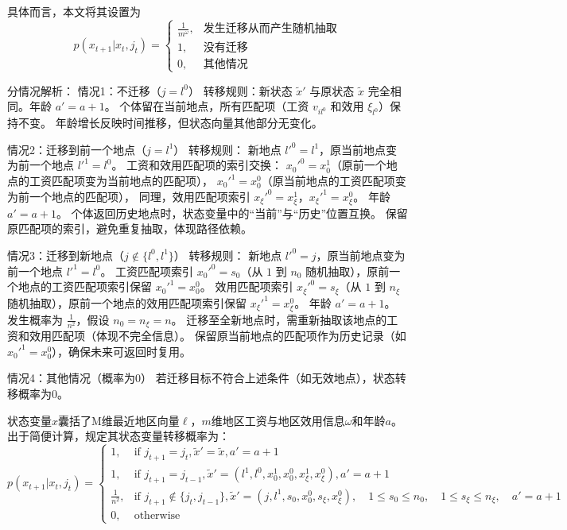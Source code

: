 \documentclass[a4paper,12pt,oneside]{book} %
\begin{document}
具体而言，本文将其设置为
\begin{equation}
  p(x_{t+1}|x_t,j_t)=
  \begin{cases}
    \frac{1}{m^\omega}
    , &\text{发生迁移从而产生随机抽取}
    \\
    1
    , &\text{没有迁移}
    \\
    0
    , &\text{其他情况}
  \end{cases}
\end{equation}

分情况解析：
情况1：不迁移（$j = l^0$）
转移规则：新状态 $\tilde{x}'$ 与原状态 $\tilde{x}$ 完全相同。年龄 $a' = a + 1$。
个体留在当前地点，所有匹配项（工资 $v_{il^0}$ 和效用 $\xi_{l^0}$）保持不变。
年龄增长反映时间推移，但状态向量其他部分无变化。

情况2：迁移到前一个地点（$j = l^1$）
转移规则：
新地点 $l'^0 = l^1$，原当前地点变为前一个地点 $l'^1 = l^0$。
工资和效用匹配项的索引交换：  
$x_0'^0 = x_0^1$（原前一个地点的工资匹配项变为当前地点的匹配项），  
$x_0'^1 = x_0^0$（原当前地点的工资匹配项变为前一个地点的匹配项），  
同理，效用匹配项索引 $x_\xi'^0 = x_\xi^1$，$x_\xi'^1 = x_\xi^0$。
年龄 $a' = a + 1$。
个体返回历史地点时，状态变量中的“当前”与“历史”位置互换。
保留原匹配项的索引，避免重复抽取，体现路径依赖。

情况3：迁移到新地点（$j \notin \{l^0, l^1\}$）
转移规则：
新地点 $l'^0 = j$，原当前地点变为前一个地点 $l'^1 = l^0$。
工资匹配项索引 $x_0'^0 = s_0$（从 $1$ 到 $n_0$ 随机抽取），原前一个地点的工资匹配项索引保留 $x_0'^1 = x_0^0$。
效用匹配项索引 $x_\xi'^0 = s_\xi$（从 $1$ 到 $n_\xi$ 随机抽取），原前一个地点的效用匹配项索引保留 $x_\xi'^1 = x_\xi^0$。
年龄 $a' = a + 1$。
发生概率为 $\frac{1}{n^2}$，假设 $n_0 = n_\xi = n$。
迁移至全新地点时，需重新抽取该地点的工资和效用匹配项（体现不完全信息）。
保留原当前地点的匹配项作为历史记录（如 $x_0'^1 = x_0^0$），确保未来可返回时复用。

情况4：其他情况（概率为0）
若迁移目标不符合上述条件（如无效地点），状态转移概率为0。




状态变量$x$囊括了M维最近地区向量$\ell$，$m$维地区工资与地区效用信息$\omega$和年龄$a$。出于简便计算，规定其状态变量转移概率为：
\begin{equation}
p(x_{t+1}|x_t, j_t) = 
\begin{cases} 
1, & \text{if } j_{t+1} = j_t, \tilde{x}' = \tilde{x}, a' = a + 1 \\
1, & \text{if } j_{t+1} = j_{t-1}, \tilde{x}' = (l^1, l^0, x_0^1, x_0^0, x_\xi^1, x_\xi^0), a' = a + 1 \\
\frac{1}{n^2}, & \text{if } j_{t+1} \notin \{j_t, j_{t-1}\}, \tilde{x}' = (j, l^1, s_0, x_0^0, s_\xi, x_\xi^0), \quad 1 \leq s_0 \leq n_0, \quad 1 \leq s_\xi \leq n_\xi, \quad a' = a + 1 \\
0, & \text{otherwise}
\end{cases}
\end{equation}
\end{document}
